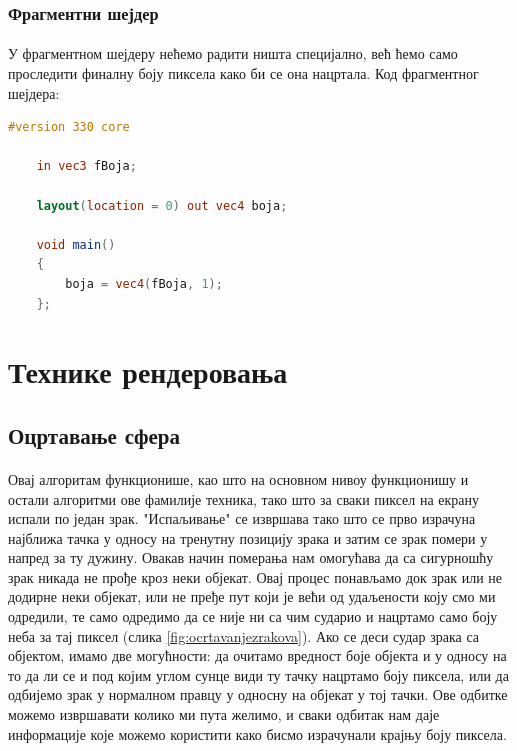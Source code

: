 \documentclass[12pt]{article}
\begin{document}
	\pagebreak
	
	\subsubsection{Фрагментни шејдер}
	\paragraph{}
	У фрагментном шејдеру нећемо радити ништа специјално, већ ћемо само проследити финалну боју пиксела како би се она нацртала. Код фрагментног шејдера:
	\begin{lstlisting}[language=GLSL]
	#version 330 core
	
	in vec3 fBoja;
	
	layout(location = 0) out vec4 boja;
	
	void main()
	{
		boja = vec4(fBoja, 1);
	};
	\end{lstlisting}
	
	\pagebreak
	
	\section{Технике рендеровања}
	
	\subsection{Оцртавање сфера}\label{sfericnorenderovanje}
	\paragraph{}
	Овај алгоритам функционише, као што на основном нивоу функционишу и остали алгоритми ове фамилије техника, тако што за сваки пиксел на екрану испали по један зрак. "Испаљивање" се извршава тако што се прво израчуна најближа тачка у односу на тренутну позицију зрака и затим се зрак помери у напред за ту дужину. Овакав начин померања нам омогућава да са сигурношћу зрак никада не прође кроз неки објекат. Овај процес понављамо док зрак или не додирне неки објекат, или не пређе пут који је већи од удаљености коју смо ми одредили, те само одредимо да се није ни са чим сударио и нацртамо само боју неба за тај пиксел (слика \ref{fig:ocrtavanjezrakova}). Ако се деси судар зрака са објектом, имамо две могућности: да очитамо вредност боје објекта и у односу на то да ли се и под којим углом сунце види ту тачку нацртамо боју пиксела, или да одбијемо зрак у нормалном правцу у односну на објекат у тој тачки. Ове одбитке можемо извршавати колико ми пута желимо, и сваки одбитак нам даје информације које можемо користити како бисмо израчунали крајњу боју пиксела.
\end{document}
